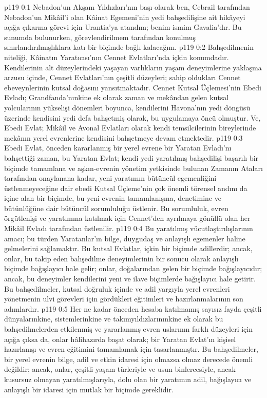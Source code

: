 \vs p119 0:1 Nebadon’un Akşam Yıldızları’nın başı olarak ben, Cebrail tarafından Nebadon’un Mikâil’i olan Kâinat Egemeni’nin yedi bahşedilişine ait hikâyeyi açığa çıkarma görevi için Urantia’ya atandım; benim ismim Gavalia’dır. Bu sunumda bulunurken, görevlendirilmem tarafından konulmuş sınırlandırılmışlıklara katı bir biçimde bağlı kalacağım.
\vs p119 0:2 Bahşedilmenin niteliği, Kâinatın Yaratıcısı’nın Cennet Evlatları’nda içkin konumdadır. Kendilerinin alt düzeylerindeki yaşayan varlıkların yaşam deneyimlerine yaklaşma arzusu içinde, Cennet Evlatları’nın çeşitli düzeyleri; sahip oldukları Cennet ebeveynlerinin kutsal doğasını yansıtmaktadır. Cennet Kutsal Üçlemesi’nin Ebedi Evladı; Grandfanda’nınkine ek olarak zaman ve mekândan gelen kutsal yolcularının yükselişi dönemleri boyunca, kendilerini Havona’nın yedi döngüsü üzerinde kendisini yedi defa bahşetmiş olarak, bu uygulamaya öncü olmuştur. Ve, Ebedi Evlat; Mikâil ve Avonal Evlatları olarak kendi temsilcilerinin bireylerinde mekânın yerel evrenlerine kendisini bahşetmeye devam etmektedir.
\vs p119 0:3 Ebedi Evlat, önceden kararlanmış bir yerel evrene bir Yaratan Evladı’nı bahşettiği zaman, bu Yaratan Evlat; kendi yedi yaratılmış bahşedilişi başarılı bir biçimde tamamlana ve aşkın\hyp{}evrenin yönetim yetkisinde bulunan Zamanın Ataları tarafından onaylanana kadar, yeni yaratımın bütüncül egemenliğini üstlenmeyeceğine dair ebedi Kutsal Üçleme’nin çok önemli törensel andını da içine alan bir biçimde, bu yeni evrenin tamamlanışına, denetimine ve bütünlüğüne dair bütüncül sorumluluğu üstlenir. Bu sorumluluk, evren örgütlenişi ve yaratımına katılmak için Cennet’den ayrılmaya gönüllü olan her Mikâil Evladı tarafından üstlenilir.
\vs p119 0:4 Bu yaratılmış vücutlaştırılışlarının amacı; bu türden Yaratanlar’ın bilge, duygudaş ve anlayışlı egemenler haline gelmelerini sağlamaktır. Bu kutsal Evlatlar, içkin bir biçimde adillerdir; ancak, onlar, bu takip eden bahşedilme deneyimlerinin bir sonucu olarak anlayışlı biçimde bağışlayıcı hale gelir; onlar, doğalarından gelen bir biçimde bağışlayıcıdır; ancak, bu deneyimler kendilerini yeni ve ilave biçimlerde bağışlayıcı hale getirir. Bu bahşedilmeler, kutsal doğruluk içinde ve adil yargıyla yerel evrenleri yönetmenin ulvi görevleri için gördükleri eğitimleri ve hazırlanmalarının son adımlardır.
\vs p119 0:5 Her ne kadar önceden hesaba katılmamış sayısız fayda çeşitli dünyalarınkine, sistemlerinkine ve takımyıldızlarınınkine ek olarak bu bahşedilmelerden etkilenmiş ve yararlanmış evren uslarının farklı düzeyleri için açığa çıksa da, onlar hâlihazırda başat olarak; bir Yaratan Evlat’ın kişisel hazırlanışı ve evren eğitimini tamamlamak için tasarlanmıştır. Bu bahşedilmeler, bir yerel evrenin bilge, adil ve etkin idaresi için olmazsa olmaz derecede önemli değildir; ancak, onlar, çeşitli yaşam türleriyle ve usun binlercesiyle, ancak kusursuz olmayan yaratılmışlarıyla, dolu olan bir yaratımın adil, bağışlayıcı ve anlayışlı bir idaresi için mutlak bir biçimde gereklidir.
